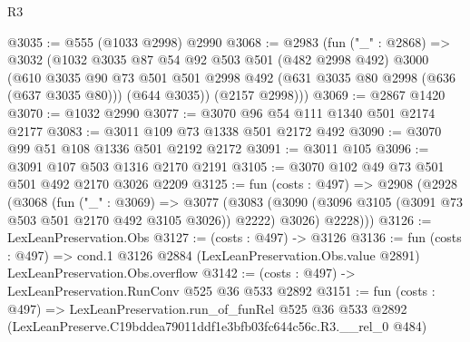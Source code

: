 \begin{lexlean}{R3}
\begin{coremodule}
@3035 := @555 (@1033 @2998) @2990
@3068 := @2983
    (fun ("_" : @2868) =>
    @3032
      (@1032
        @3035
        @87
        @54
        @92
        @503
        @501
        (@482 @2998 @492)
        @3000
        (@610
          @3035
          @90
          @73
          @501
          @501
          @2998
          @492
          (@631 @3035 @80 @2998 (@636 (@637 @3035 @80)))
          (@644 @3035))
        (@2157 @2998)))
@3069 := @2867 @1420
@3070 := @1032 @2990
@3077 := @3070 @96 @54 @111 @1340 @501 @2174 @2177
@3083 := @3011 @109 @73 @1338 @501 @2172 @492
@3090 := @3070 @99 @51 @108 @1336 @501 @2192 @2172
@3091 := @3011 @105
@3096 := @3091 @107 @503 @1316 @2170 @2191
@3105 := @3070 @102 @49 @73 @501 @501 @492 @2170 @3026 @2209
@3125 := fun (costs : @497) =>
  @2908
    (@2928
      (@3068
        (fun ("_" : @3069) =>
        @3077
          (@3083 (@3090 (@3096 @3105 (@3091 @73 @503 @501 @2170 @492 @3105 @3026)) @2222) @3026)
          @2228)))
@3126 := LexLeanPreservation.Obs
@3127 := (costs : @497) -> @3126
@3136 := fun (costs : @497) =>
  cond.{1} @3126 @2884 (LexLeanPreservation.Obs.value @2891) LexLeanPreservation.Obs.overflow
@3142 := (costs : @497) -> LexLeanPreservation.RunConv @525 @36 @533 @2892
@3151 := fun (costs : @497) =>
  LexLeanPreservation.run_of_funRel
    @525
    @36
    @533
    @2892
    (LexLeanPreserve.C19bddea79011ddf1e3bfb03fc644c56c.R3.__rel_0 @484)
\end{coremodule}
\end{lexlean}

